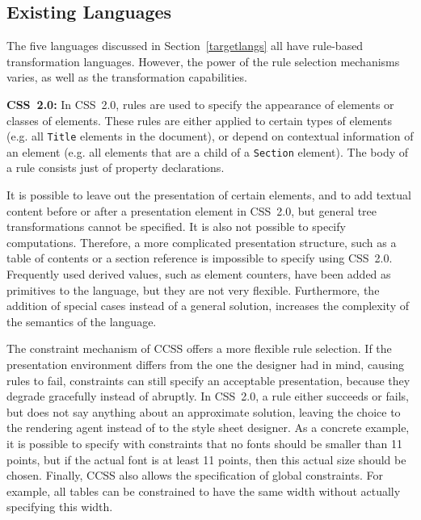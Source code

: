 %																
\subsection{Existing Languages}

The five languages discussed in Section~\ref{targetlangs} all have rule-based transformation languages. However, the power of the rule selection mechanisms varies, as well as the transformation capabilities.{\bf }

{\bf CSS~2.0:} In CSS~2.0, rules are used to specify the appearance of elements or classes of elements. These rules are either applied to certain types of elements (e.g. all \texttt{Title} elements in the document), or depend on contextual information of an element (e.g. all elements that are a child of a \texttt{Section} element). The body of a rule consists just of property declarations.

It is possible to leave out the presentation of certain elements, and to add textual content before or after a presentation element in CSS~2.0, but general tree transformations cannot be specified. It is also not possible to specify computations. Therefore, a more complicated presentation structure, such as a table of contents or a section reference is impossible to specify using CSS~2.0. Frequently used derived values, such as element counters, have been added as primitives to the language, but they are not very flexible. Furthermore, the addition of special cases instead of a general solution, increases the complexity of the semantics of the language.

 The constraint mechanism of CCSS offers a more flexible rule selection. If the presentation environment differs from the one the designer had in mind, causing rules to fail, constraints can still specify an acceptable presentation, because they degrade gracefully instead of abruptly. In CSS~2.0, a rule either succeeds or fails, but does not say anything about an approximate solution, leaving the choice to the rendering agent instead of to the style sheet designer. As a concrete example, it is possible to specify with constraints that no fonts should be smaller than 11 points, but if the actual font is at least 11 points, then this actual size should be chosen. Finally, CCSS also allows the specification of global constraints. For example, all tables can be constrained to have the same width without actually specifying this width.

